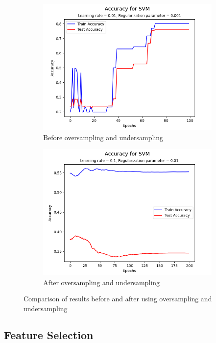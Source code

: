 \documentclass[a4paper, utf8]{ctexart}
\begin{document}
	\begin{figure}[htbp]
		\centering
		\begin{subfigure}{.45\textwidth}
			\centering
			\includegraphics[width=.9\textwidth]{./figure/myplotS1.png}
			\caption{Before oversampling and undersampling}
		\end{subfigure}
		\begin{subfigure}{.45\textwidth}
			\centering
			\includegraphics[width=.9\textwidth]{./figure/myplotFS1.png}
			\caption{After oversampling and undersampling}
		\end{subfigure}
		\caption{Comparison of results before and after using oversampling and undersampling}
	\end{figure}
	
	\subsection{Feature Selection}
	
\end{document}
